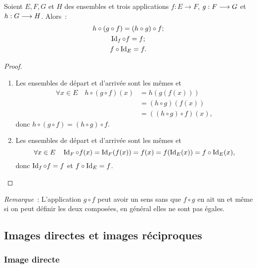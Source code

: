\begin{prop}
    Soient \(E,F,G\) et \(H\) des ensembles et trois applications \(f:E 
    \longrightarrow F\), \(g:F \longrightarrow G\) et \(h:G \longrightarrow H\). 
    Alors~:
    \begin{gather}
        h \circ (g \circ f)=(h \circ g) \circ f;\\
        \operatorname{Id}_f \circ f = f;\\
        f \circ \operatorname{Id}_E=f.
    \end{gather}
\end{prop}

\begin{proof}
    \begin{enumerate}
        \item Les ensembles de départ et d'arrivée sont les mêmes et 
            \begin{align}
                \forall x \in E \quad h \circ (g \circ f)(x) &=h(g(f(x))) \\ 
                                                             &=(h \circ g)(f(x)) \\ 
                                                             &=((h \circ g) 
                                                             \circ f)(x),
            \end{align}
            donc \(h \circ (g \circ f)=(h \circ g) \circ f\).
        \item Les ensembles de départ et d'arrivée sont les mêmes et 
            \begin{equation}
                \forall x \in E \quad \operatorname{Id}_F \circ 
                f(x)=\operatorname{Id}_F(f(x))=f(x)=f(\operatorname{Id}_E(x))=f \circ \operatorname{Id}_E(x),
            \end{equation}
            donc \(\operatorname{Id}_f \circ f = f\) et \(f \circ \operatorname{Id}_E=f\).
    \end{enumerate}
\end{proof}

\emph{Remarque}~: L'application \(g \circ f\) peut avoir un sens sans que \(f 
\circ g\) en ait un et même si on peut définir les deux composées, en général 
elles ne sont pas égales.

\subsection{Images directes et images réciproques}
\label{chap3-subsec:imagesdirecteetrec}

\subsubsection{Image directe}
\label{chap3-subsec:imagedirecte}

